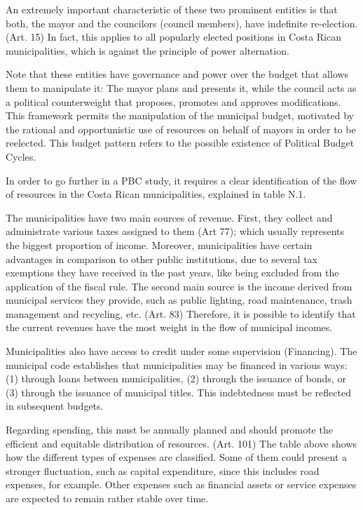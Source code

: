 An extremely important characteristic of these two prominent entities is that both, the mayor and the councilors (council members), have indefinite re-election. (Art. 15) In fact, this applies to all popularly elected positions in Costa Rican municipalities, which is against the principle of power alternation. 

Note that these entities have governance and power over the budget that allows them to manipulate it: The mayor plans and presents it, while the council acts as a political counterweight that proposes, promotes and approves modifications. This framework permits the manipulation of the municipal budget, motivated by the rational and opportunistic use of resources on behalf of mayors in order to be reelected. This budget pattern refers to the possible existence of Political Budget Cycles.

In order to go further in a PBC study, it requires a clear identification of the flow of resources in the Costa Rican municipalities, explained in table N.1.

The municipalities have two main sources of revenue. First, they collect and administrate various taxes assigned to them (Art 77); which usually represents the biggest proportion of income. Moreover, municipalities have certain advantages in comparison to other public institutions, due to several tax exemptions they have received in the past years, like being excluded from the application of the fiscal rule. The second main source is the income derived from municipal services they provide, such as public lighting, road maintenance, trash management and recycling, etc. (Art. 83) Therefore, it is possible to identify that the current revenues have the most weight in the flow of municipal incomes.

Municipalities also have access to credit under some supervision (Financing). The municipal code establishes that municipalities may be financed in various ways: (1) through loans between municipalities, (2) through the issuance of bonds, or (3) through the issuance of municipal titles. This indebtedness must be reflected in subsequent budgets.

Regarding spending, this must be annually planned and should promote the efficient and equitable distribution of resources. (Art. 101) The table above shows how the different types of expenses are classified. Some of them could present a stronger fluctuation, such as capital expenditure, since this includes road expenses, for example. Other expenses such as financial assets or service expenses are expected to remain rather stable over time.


